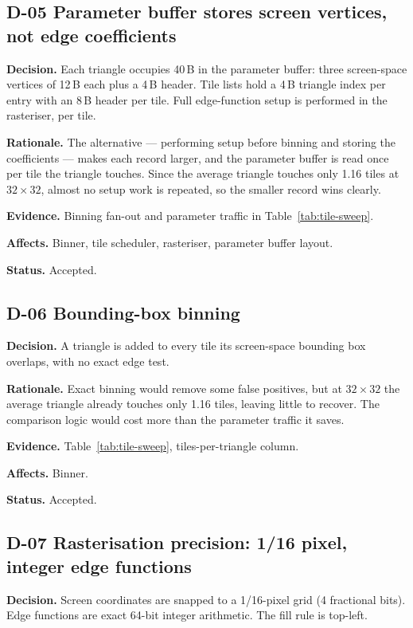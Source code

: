 \documentclass[11pt,a4paper]{article}
\newcommand{\field}[1]{\textbf{#1}\quad}
\begin{document}
\subsection{D-05 \quad Parameter buffer stores screen vertices, not edge
coefficients}
\field{Decision.} Each triangle occupies 40\,B in the parameter buffer: three
screen-space vertices of 12\,B each plus a 4\,B header. Tile lists hold a 4\,B
triangle index per entry with an 8\,B header per tile. Full edge-function setup
is performed in the rasteriser, per tile.

\field{Rationale.} The alternative --- performing setup before binning and
storing the coefficients --- makes each record larger, and the parameter buffer
is read once per tile the triangle touches. Since the average triangle touches
only 1.16 tiles at $32\times32$, almost no setup work is repeated, so the
smaller record wins clearly.

\field{Evidence.} Binning fan-out and parameter traffic in
Table~\ref{tab:tile-sweep}.

\field{Affects.} Binner, tile scheduler, rasteriser, parameter buffer layout.

\field{Status.} Accepted.

\subsection{D-06 \quad Bounding-box binning}
\field{Decision.} A triangle is added to every tile its screen-space bounding
box overlaps, with no exact edge test.

\field{Rationale.} Exact binning would remove some false positives, but at
$32\times32$ the average triangle already touches only 1.16 tiles, leaving
little to recover. The comparison logic would cost more than the parameter
traffic it saves.

\field{Evidence.} Table~\ref{tab:tile-sweep}, tiles-per-triangle column.

\field{Affects.} Binner.

\field{Status.} Accepted.

\subsection{D-07 \quad Rasterisation precision: 1/16 pixel, integer edge
functions}
\field{Decision.} Screen coordinates are snapped to a 1/16-pixel grid (4
fractional bits). Edge functions are exact 64-bit integer arithmetic. The fill
rule is top-left.
\end{document}
